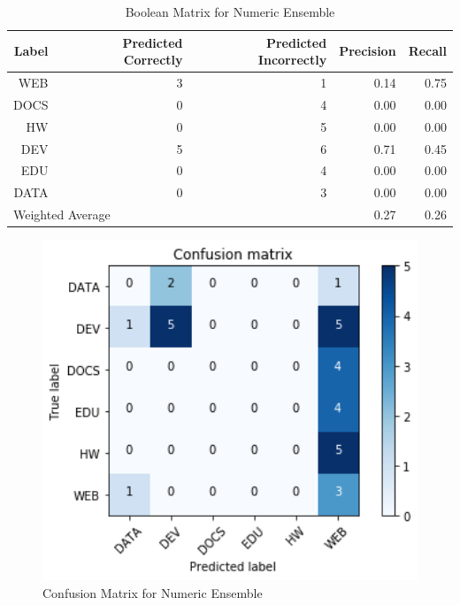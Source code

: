 \begin{table}[h]
\centering
\caption{Boolean Matrix for Numeric Ensemble}
\label{boolean_matrix_numeric_ensemble}
\begin{tabular}{|r|r|r|r|r|}
 \hline
 Label & Predicted Correctly & Predicted Incorrectly & Precision & Recall \\ \hline
 WEB & 3 & 1 & 0.14 & 0.75 \\ \hline
 DOCS & 0 & 4 & 0.00 & 0.00 \\ \hline
 HW & 0 & 5 & 0.00 & 0.00 \\ \hline
 DEV & 5 & 6 & 0.71 & 0.45 \\ \hline
 EDU & 0 & 4 & 0.00 & 0.00 \\ \hline
 DATA & 0 & 3 & 0.00 & 0.00 \\ \hline
 \multicolumn{3}{|l|}{Weighted Average} & 0.27 & 0.26 \\ \hline
 \end{tabular}
 \end{table}

\begin{figure}[h]
	\centering
		\includegraphics[width=12cm]{graphics/confusion-matrix-numeric-ensemble.png}
	\caption{Confusion Matrix for Numeric Ensemble}
	\label{confusion_matrix_numeric_ensemble}
\end{figure}
